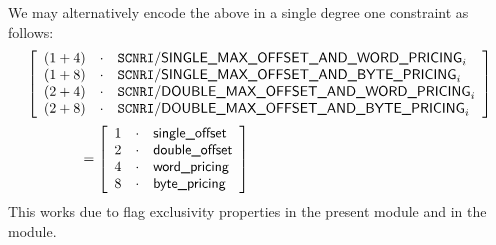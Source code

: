 \saNote{}
We may alternatively encode the above in a single degree one constraint as follows:
\[
	\begin{array}{l}
		\left[ \begin{array}{lcl}
			(1 + 4) & \cdot & \mxpScenarioSingleMaxOffsetAndWordPricing _{i} \\
			(1 + 8) & \cdot & \mxpScenarioSingleMaxOffsetAndBytePricing _{i} \\
			(2 + 4) & \cdot & \mxpScenarioDoubleMaxOffsetAndWordPricing _{i} \\
			(2 + 8) & \cdot & \mxpScenarioDoubleMaxOffsetAndBytePricing _{i} \\
		\end{array} \right] \vspace{2mm} \\
		\qquad\qquad =
		\left[ \begin{array}{lcl}
			1 & \cdot & \locSingleOffsetOpcode \\
			2 & \cdot & \locDoubleOffsetOpcode \\
			4 & \cdot & \locWordPricingOpcode  \\
			8 & \cdot & \locBytePricingOpcode  \\
		\end{array} \right] \\
	\end{array}
\]
This works due to flag exclusivity properties in the present \mxpMod{} module and in the \idMod{} module.
